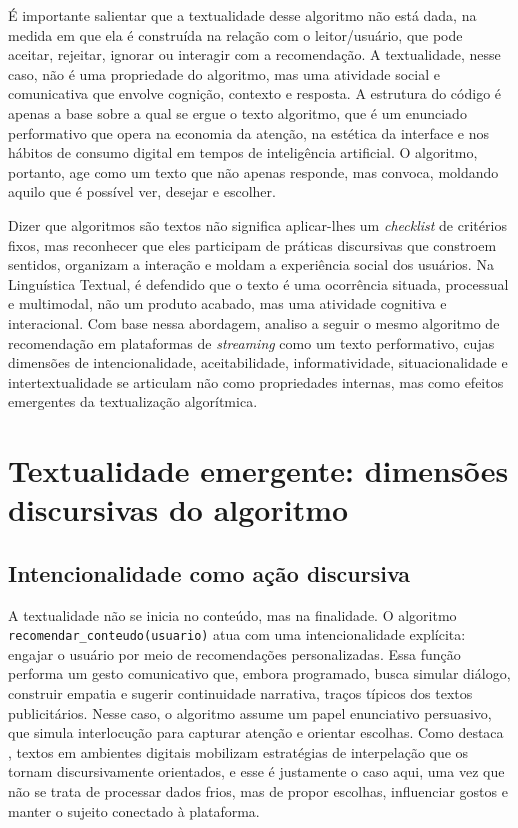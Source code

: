 \documentclass[portuguese]{textolivre}
\begin{document}
É importante salientar que a textualidade desse algoritmo não está dada, na medida em que ela é construída na relação com o leitor/usuário, que pode aceitar, rejeitar, ignorar ou interagir com a recomendação. A textualidade, nesse caso, não é uma propriedade do algoritmo, mas uma atividade social e comunicativa que envolve cognição, contexto e resposta. A estrutura do código é apenas a base sobre a qual se ergue o texto algoritmo, que é um enunciado performativo que opera na economia da atenção, na estética da interface e nos hábitos de consumo digital em tempos de inteligência artificial. O algoritmo, portanto, age como um texto que não apenas responde, mas convoca, moldando aquilo que é possível ver, desejar e escolher.

Dizer que algoritmos são textos não significa aplicar-lhes um \textit{checklist} de critérios fixos, mas reconhecer que eles participam de práticas discursivas que constroem sentidos, organizam a interação e moldam a experiência social dos usuários. Na Linguística Textual, é defendido que o texto é uma ocorrência situada, processual e multimodal, não um produto acabado, mas uma atividade cognitiva e interacional. Com base nessa abordagem, analiso a seguir o mesmo algoritmo de recomendação em plataformas de \textit{streaming} como um texto performativo, cujas dimensões de intencionalidade, aceitabilidade, informatividade, situacionalidade e intertextualidade se articulam não como propriedades internas, mas como efeitos emergentes da textualização algorítmica.

\section{Textualidade emergente: dimensões discursivas do algoritmo}\label{sec-organizacao-latex}
\subsection{Intencionalidade como ação discursiva}
A textualidade não se inicia no conteúdo, mas na finalidade. O algoritmo \lstinline[language=Python]{recomendar_conteudo(usuario)} atua com uma intencionalidade explícita: engajar o usuário por meio de recomendações personalizadas. Essa função performa um gesto comunicativo que, embora programado, busca simular diálogo, construir empatia e sugerir continuidade narrativa, traços típicos dos textos publicitários. Nesse caso, o algoritmo assume um papel enunciativo persuasivo, que simula interlocução para capturar atenção e orientar escolhas. Como destaca \textcite{marcuschi2008}, textos em ambientes digitais mobilizam estratégias de interpelação que os tornam discursivamente orientados, e esse é justamente o caso aqui, uma vez que não se trata de processar dados frios, mas de propor escolhas, influenciar gostos e manter o sujeito conectado à plataforma.
\end{document}
